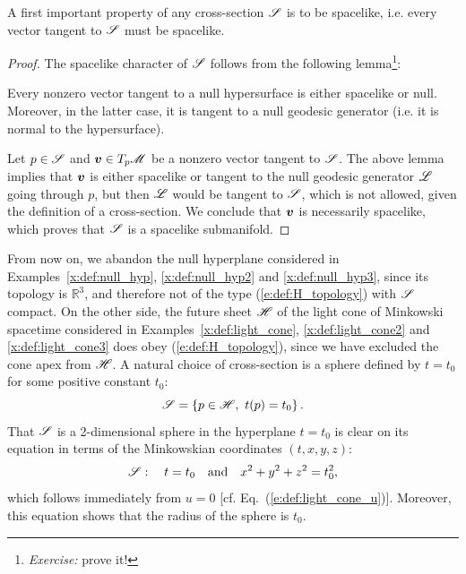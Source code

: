 A first important property of any cross-section $\mathscr{S}$ is to be spacelike,
i.e. every vector
tangent to $\mathscr{S}$ must be spacelike.
\begin{proof}
The spacelike character of $\mathscr{S}$ follows from the following
lemma\footnote{\emph{Exercise:} prove it!}:
\begin{greybox}
Every nonzero vector tangent to a null hypersurface is either spacelike or null.
Moreover, in the latter case, it is tangent to a null geodesic generator (i.e. it is normal
to the hypersurface).
\end{greybox}
Let $p \in \mathscr{S}$ and $\bm{v}\in T_p\mathscr{M}$ be a nonzero vector tangent to $\mathscr{S}$.
The above lemma implies that $\bm{v}$ is either spacelike or tangent to the
null geodesic generator $\mathscr{L}$ going through $p$, but then $\mathscr{L}$ would be tangent to $\mathscr{S}$,
which is not allowed, given the definition of a cross-section. We conclude
that $\bm{v}$ is necessarily spacelike, which proves that $\mathscr{S}$ is a spacelike
submanifold.
\end{proof}

\begin{example} \label{x:def:light_cone4}
From now on, we abandon the null hyperplane considered in Examples~\ref{x:def:null_hyp},
\ref{x:def:null_hyp2} and \ref{x:def:null_hyp3}, since its topology is $\mathbb{R}^3$,
and therefore not of the type (\ref{e:def:H_topology}) with $\mathscr{S}$ compact.
On the other side, the future sheet $\mathscr{H}$ of the light cone of Minkowski spacetime considered in Examples~\ref{x:def:light_cone},
\ref{x:def:light_cone2} and \ref{x:def:light_cone3} does obey (\ref{e:def:H_topology}),
since we have excluded the cone apex from $\mathscr{H}$.
A natural choice of cross-section is a sphere defined by $t=t_0$ for some positive constant $t_0$:
\[
    \mathscr{S} = \left\{ p \in \mathscr{H},\  t(p) = t_0 \right\} .
\]
That $\mathscr{S}$ is a 2-dimensional sphere in the hyperplane $t=t_0$ is clear on its equation in terms
of the Minkowskian coordinates $(t,x,y,z)$:
\[
\mathscr{S}: \quad t=t_0 \quad\mbox{and}\quad x^2+y^2+z^2 = t_0^2,
\]
which follows immediately from $u=0$
[cf. Eq.~(\ref{e:def:light_cone_u})]. Moreover, this equation shows that the
radius of the sphere is $t_0$.
\end{example}

